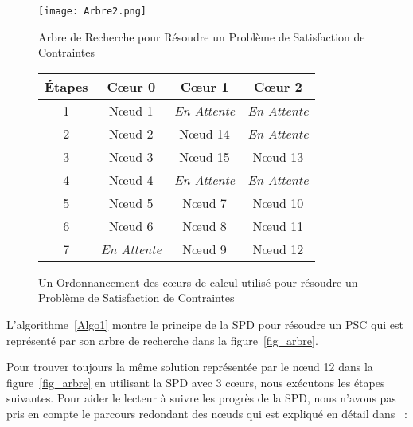 \documentclass[parallelisme]{compas2014}
\begin{document}
\begin{figure}[htbp]
\begin{minipage}[c]{.5\linewidth}
\center \texttt{[image: Arbre2.png]}
\caption{Arbre de Recherche pour Résoudre un Problème de Satisfaction de Contraintes}
\label{fig_arbre}

\end{minipage}
\hfill
\begin{minipage}[c]{.45\linewidth}
\small
        \center \begin{tabular}{|c|c|c|c|}
        \hline
        Étapes & Cœur 0 & Cœur 1 & Cœur 2\\ \hline
        1 & Nœud 1 & \textit{En Attente} & \textit{En Attente} \\ \hline
        2 & Nœud 2 & Nœud 14 & \textit{En Attente} \\ \hline
        3 & Nœud 3 & Nœud 15 & Nœud 13 \\ \hline
        4 & Nœud 4 & \textit{En Attente} & \textit{En Attente} \\ \hline
        5 & Nœud 5 & Nœud 7 & Nœud 10 \\ \hline 
        6 & Nœud 6 & Nœud 8 & Nœud 11 \\ \hline                                                 
        7 & \textit{En Attente} & Nœud 9 & Nœud 12\\ \hline
        \end{tabular}
        \caption {Un Ordonnancement des cœurs de calcul utilisé pour résoudre un Problème de Satisfaction de Contraintes}
         \label{table_1}

\end{minipage}
\end{figure}

L'algorithme~\ref{Algo1} montre le principe de la SPD pour résoudre un PSC qui est représenté par son arbre de recherche dans la figure~\ref{fig_arbre}.

Pour trouver toujours la même solution représentée par le nœud 12 dans la figure~\ref{fig_arbre} en utilisant la SPD avec 3 cœurs, nous exécutons les étapes suivantes. Pour aider le lecteur à suivre les progrès de la SPD, nous n'avons pas pris en compte le parcours redondant des nœuds qui est expliqué en détail dans~\cite{TMBLPCO13} :
\end{document}
